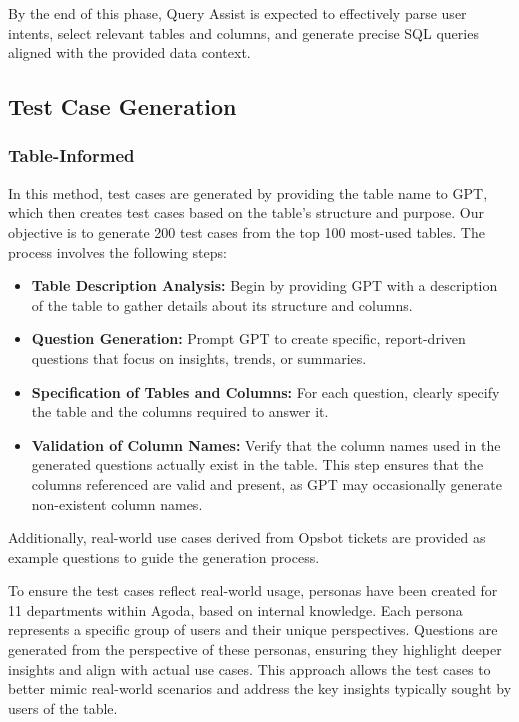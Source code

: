     By the end of this phase, Query Assist is expected to effectively parse user intents, select relevant tables and columns, and generate precise SQL queries aligned with the provided data context.
    \subsection{Test Case Generation}
        \subsubsection{Table-Informed}
        In this method, test cases are generated by providing the table name to GPT, which then creates test cases based on the table's structure and purpose. Our objective is to generate 200 test cases from the top 100 most-used tables. The process involves the following steps:
        \begin{itemize}
            \item \textbf{Table Description Analysis:} Begin by providing GPT with a description of the table to gather details about its structure and columns.
            \item \textbf{Question Generation:} Prompt GPT to create specific, report-driven questions that focus on insights, trends, or summaries.
            \item \textbf{Specification of Tables and Columns:} For each question, clearly specify the table and the columns required to answer it.
            \item \textbf{Validation of Column Names:} Verify that the column names used in the generated questions actually exist in the table. This step ensures that the columns referenced are valid and present, as GPT may occasionally generate non-existent column names.
        \end{itemize}
        Additionally, real-world use cases derived from Opsbot tickets are provided as example questions to guide the generation process.

        To ensure the test cases reflect real-world usage, personas have been created for 11 departments within Agoda, based on internal knowledge. Each persona represents a specific group of users and their unique perspectives. Questions are generated from the perspective of these personas, ensuring they highlight deeper insights and align with actual use cases. This approach allows the test cases to better mimic real-world scenarios and address the key insights typically sought by users of the table.
